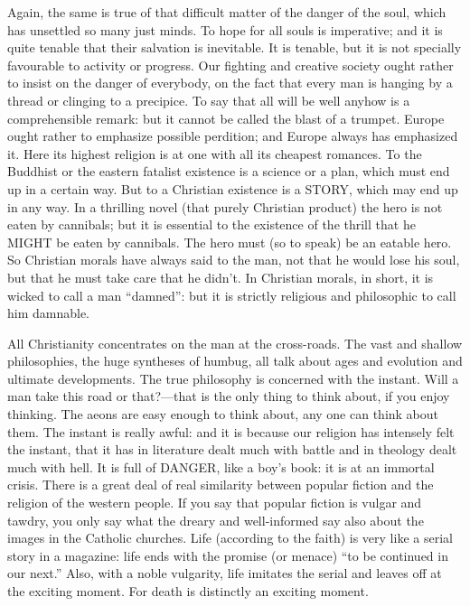 Again, the same is true of that difficult matter of the danger of the soul, which has unsettled so many just minds. To hope for all souls is imperative; and it is quite tenable that their salvation is inevitable. It is tenable, but it is not specially favourable to activity or progress. Our fighting and creative society ought rather to insist on the danger of everybody, on the fact that every man is hanging by a thread or clinging to a precipice. To say that all will be well anyhow is a comprehensible remark: but it cannot be called the blast of a trumpet. Europe ought rather to emphasize possible perdition; and Europe always has emphasized it. Here its highest religion is at one with all its cheapest romances. To the Buddhist or the eastern fatalist existence is a science or a plan, which must end up in a certain way. But to a Christian existence is a STORY, which may end up in any way. In a thrilling novel (that purely Christian product) the hero is not eaten by cannibals; but it is essential to the existence of the thrill that he MIGHT be eaten by cannibals. The hero must (so to speak) be an eatable hero. So Christian morals have always said to the man, not that he would lose his soul, but that he must take care that he didn’t. In Christian morals, in short, it is wicked to call a man “damned”: but it is strictly religious and philosophic to call him damnable.

All Christianity concentrates on the man at the cross-roads. The vast and shallow philosophies, the huge syntheses of humbug, all talk about ages and evolution and ultimate developments. The true philosophy is concerned with the instant. Will a man take this road or that?—that is the only thing to think about, if you enjoy thinking. The aeons are easy enough to think about, any one can think about them. The instant is really awful: and it is because our religion has intensely felt the instant, that it has in literature dealt much with battle and in theology dealt much with hell. It is full of DANGER, like a boy’s book: it is at an immortal crisis. There is a great deal of real similarity between popular fiction and the religion of the western people. If you say that popular fiction is vulgar and tawdry, you only say what the dreary and well-informed say also about the images in the Catholic churches. Life (according to the faith) is very like a serial story in a magazine: life ends with the promise (or menace) “to be continued in our next.” Also, with a noble vulgarity, life imitates the serial and leaves off at the exciting moment. For death is distinctly an exciting moment.

